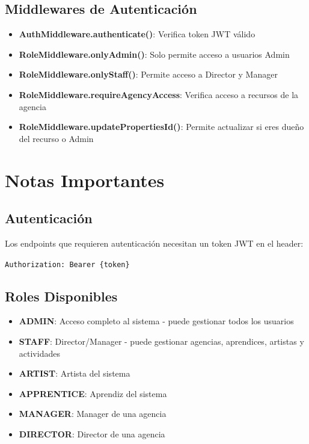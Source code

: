\documentclass[11pt]{article}
\begin{document}
\subsection*{Middlewares de Autenticación}
\begin{itemize}
    \item \textbf{AuthMiddleware.authenticate()}: Verifica token JWT válido
    \item \textbf{RoleMiddleware.onlyAdmin()}: Solo permite acceso a usuarios Admin
    \item \textbf{RoleMiddleware.onlyStaff()}: Permite acceso a Director y Manager
    \item \textbf{RoleMiddleware.requireAgencyAccess}: Verifica acceso a recursos de la agencia
    \item \textbf{RoleMiddleware.updatePropertiesId()}: Permite actualizar si eres dueño del recurso o Admin
\end{itemize}

\section{Notas Importantes}

\subsection*{Autenticación}
Los endpoints que requieren autenticación necesitan un token JWT en el header:

\texttt{Authorization: Bearer \{token\}}

\subsection*{Roles Disponibles}
\begin{itemize}
    \item \textbf{ADMIN}: Acceso completo al sistema - puede gestionar todos los usuarios
    \item \textbf{STAFF}: Director/Manager - puede gestionar agencias, aprendices, artistas y actividades
    \item \textbf{ARTIST}: Artista del sistema
    \item \textbf{APPRENTICE}: Aprendiz del sistema
    \item \textbf{MANAGER}: Manager de una agencia
    \item \textbf{DIRECTOR}: Director de una agencia
\end{itemize}
\end{document}
